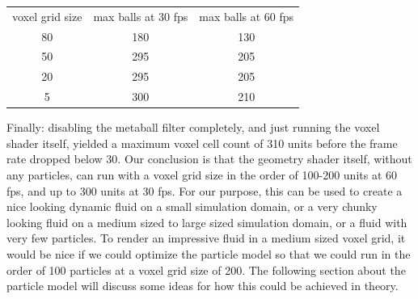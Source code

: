 \documentclass{article}
\begin{document}
\begin{multicols}{2}
		\noindent
        \begin{tabular}{ c | c | c }
            voxel grid size & max balls at 30 fps & max balls at 60 fps \\
            80 & 180 & 130 \\
            50 & 295 & 205 \\
            20 & 295 & 205 \\
            5 & 300 & 210 \\
        \end{tabular}

        Finally: disabling the metaball filter completely, and just running the voxel shader itself, yielded a maximum voxel cell count of 310 units before the frame rate dropped below 30.
        Our conclusion is that the geometry shader itself, without any particles, can run with a voxel grid size in the order of 100-200 units at 60 fps, and up to 300 units at 30 fps.
        For our purpose, this can be used to create a nice looking dynamic fluid on a small simulation domain, or a very chunky looking fluid on a medium sized to large sized simulation domain, or a fluid with very few particles.
        To render an impressive fluid in a medium sized voxel grid, it would be nice if we could optimize the particle model so that we could run in the order of 100 particles at a voxel grid size of 200.
        The following section about the particle model will discuss some ideas for how this could be achieved in theory.


\end{multicols}
\end{document}
